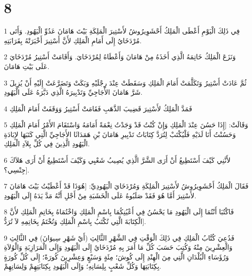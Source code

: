 \chapter{8}

\par 1 فِي ذَلِكَ الْيَوْمِ أَعْطَى الْمَلِكُ أَحْشَوِيرُوشُ لأَسْتِيرَ الْمَلِكَةِ بَيْتَ هَامَانَ عَدُوِّ الْيَهُودِ. وَأَتَى مُرْدَخَايُ إِلَى أَمَامِ الْمَلِكِ لأَنَّ أَسْتِيرَ أَخْبَرَتْهُ بِقَرَابَتِهِ.
\par 2 وَنَزَعَ الْمَلِكُ خَاتِمَهُ الَّذِي أَخَذَهُ مِنْ هَامَانَ وَأَعْطَاهُ لِمُرْدَخَايَ. وَأَقَامَتْ أَسْتِيرُ مُرْدَخَايَ عَلَى بَيْتِ هَامَانَ.
\par 3 ثُمَّ عَادَتْ أَسْتِيرُ وَتَكَلَّمَتْ أَمَامَ الْمَلِكِ وَسَقَطَتْ عِنْدَ رِجْلَيْهِ وَبَكَتْ وَتَضَرَّعَتْ إِلَيْهِ أَنْ يُزِيلَ شَرَّ هَامَانَ الأَجَاجِيِّ وَتَدْبِيرَهُ الَّذِي دَبَّرَهُ عَلَى الْيَهُودِ.
\par 4 فَمَدَّ الْمَلِكُ لأَسْتِيرَ قَضِيبَ الذَّهَبِ فَقَامَتْ أَسْتِيرُ وَوَقَفَتْ أَمَامَ الْمَلِكِ
\par 5 وَقَالَتْ: [إِذَا حَسُنَ عِنْدَ الْمَلِكِ وَإِنْ كُنْتُ قَدْ وَجَدْتُ نِعْمَةً أَمَامَهُ وَاسْتَقَامَ الأَمْرُ أَمَامَ الْمَلِكِ وَحَسُنْتُ أَنَا لَدَيْهِ فَلْيُكْتَبْ لِتُرَدَّ كِتَابَاتُ تَدْبِيرِ هَامَانَ بْنِ هَمَدَاثَا الأَجَاجِيِّ الَّتِي كَتَبَهَا لإِبَادَةِ الْيَهُودِ الَّذِينَ فِي كُلِّ بِلاَدِ الْمَلِكِ.
\par 6 لأَنَّنِي كَيْفَ أَسْتَطِيعُ أَنْ أَرَى الشَّرَّ الَّذِي يُصِيبُ شَعْبِي وَكَيْفَ أَسْتَطِيعُ أَنْ أَرَى هَلاَكَ جِنْسِي؟].
\par 7 فَقَالَ الْمَلِكُ أَحْشَوِيرُوشُ لأَسْتِيرَ الْمَلِكَةِ وَمُرْدَخَايَ الْيَهُودِيِّ: [هُوَذَا قَدْ أَعْطَيْتُ بَيْتَ هَامَانَ لأَسْتِيرَ أَمَّا هُوَ فَقَدْ صَلَبُوهُ عَلَى الْخَشَبَةِ مِنْ أَجْلِ أَنَّهُ مَدَّ يَدَهُ إِلَى الْيَهُودِ.
\par 8 فَاكْتُبَا أَنْتُمَا إِلَى الْيَهُودِ مَا يَحْسُنُ فِي أَعْيُنِكُمَا بِاسْمِ الْمَلِكِ وَاخْتُمَاهُ بِخَاتِمِ الْمَلِكِ لأَنَّ الْكِتَابَةَ الَّتِي تُكْتَبُ بِاسْمِ الْمَلِكِ وَتُخْتَمُ بِخَاتِمِهِ لاَ تُرَدُّ].
\par 9 فَدُعِيَ كُتَّابُ الْمَلِكِ فِي ذَلِكَ الْوَقْتِ فِي الشَّهْرِ الثَّالِثِ (أَيْ شَهْرِ سِيوَانَ) فِي الثَّالِثِ وَالْعِشْرِينَ مِنْهُ وَكُتِبَ حَسَبَ كُلِّ مَا أَمَرَ بِهِ مُرْدَخَايُ إِلَى الْيَهُودِ وَإِلَى الْمَرَازِبَةِ وَالْوُلاَةِ وَرُؤَسَاءِ الْبُلْدَانِ الَّتِي مِنَ الْهِنْدِ إِلَى كُوشَ؛ مِئَةٍ وَسَبْعٍ وَعِشْرِينَ كُورَةً؛ إِلَى كُلِّ كُورَةٍ بِكِتَابَتِهَا وَكُلِّ شَعْبٍ بِلِسَانِهِ؛ وَإِلَى الْيَهُودِ بِكِتَابَتِهِمْ وَلِسَانِهِمْ.
